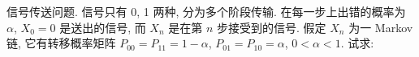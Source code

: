 \documentclass[boxes]{homework}
\begin{document}
\setlength\abovedisplayskip{.3em}
\setlength\belowdisplayskip{.3em}
\begin{problem}
信号传送问题. 信号只有 0, 1 两种, 分为多个阶段传输. 在每一步上出错的概率为 $\alpha$, $X_0 = 0$ 是送出的信号, 而
$X_n$  是在第 $n$ 步接受到的信号. 假定 $X_n$ 为一 Markov 链, 它有转移概率矩阵 $P_{00}=P_{11}=1-\alpha$,
$P_{01} =P_{10}=\alpha$, $0<\alpha<1$. 试求:
\end{problem}
\end{document}
